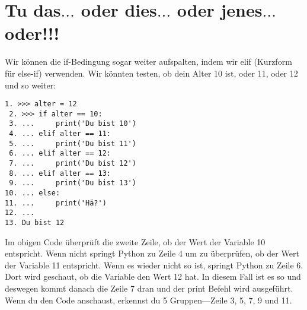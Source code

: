 \section{Tu das\texorpdfstring{$\ldots$}{...} oder dies\texorpdfstring{$\ldots$}{...} oder jenes\texorpdfstring{$\ldots$}{...} oder!!!}

Wir können die if-Bedingung sogar weiter aufspalten, indem wir elif (Kurzform für else-if) verwenden. Wir könnten testen, ob dein Alter 10 ist, oder 11, oder 12 und so weiter:

\begin{Verbatim}[frame=single]
 1. >>> alter = 12
 2. >>> if alter == 10:
 3. ...     print('Du bist 10')
 4. ... elif alter == 11:
 5. ...     print('Du bist 11')
 6. ... elif alter == 12:
 7. ...     print('Du bist 12')
 8. ... elif alter == 13:
 9. ...     print('Du bist 13')
10. ... else:
11. ...     print('Hä?')
12. ...
13. Du bist 12
\end{Verbatim}

Im obigen Code überprüft die zweite Zeile, ob der Wert der Variable 10 entspricht. Wenn nicht springt Python zu Zeile 4 um zu überprüfen, ob der Wert der  Variable 11 entspricht. Wenn es wieder nicht so ist, springt Python zu Zeile 6. Dort wird geschaut, ob die Variable den Wert 12 hat. In diesem Fall ist es so und deswegen kommt danach die Zeile 7 dran und der print Befehl wird ausgeführt. Wenn du den Code anschaust, erkennst du 5 Gruppen---Zeile 3, 5, 7, 9 und 11.


